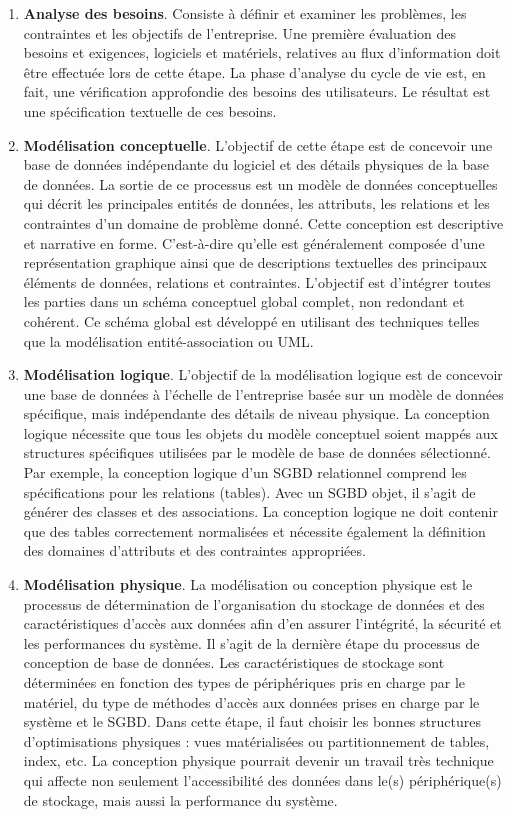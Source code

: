 \begin{enumerate}
 \item \textbf{Analyse des besoins}. Consiste à définir et examiner les problèmes, les contraintes et les objectifs de l'entreprise. Une première évaluation des besoins et exigences, logiciels et matériels, relatives au flux d'information doit être effectuée lors de cette étape. La phase d'analyse du cycle de vie est, en fait, une vérification approfondie des besoins des utilisateurs. Le résultat est une spécification textuelle de ces besoins.
 \item \textbf{Modélisation conceptuelle}. L'objectif de cette étape est de concevoir une base de données indépendante du logiciel et des détails physiques de la base de données. La sortie de ce processus est un modèle de données conceptuelles qui décrit les principales entités de données, les attributs, les relations et les contraintes d'un domaine de problème donné. Cette conception est descriptive et narrative en forme. C'est-à-dire qu'elle est généralement composée d'une représentation graphique ainsi que de descriptions textuelles des principaux éléments de données, relations et contraintes. L'objectif est d'intégrer toutes les parties dans un schéma conceptuel global complet, non redondant et cohérent. Ce schéma global est développé en utilisant des techniques telles que la modélisation entité-association ou \gls{UML}.
 \item \textbf{Modélisation logique}. L'objectif de la modélisation logique est de concevoir une base de données à l'échelle de l'entreprise basée sur un modèle de données spécifique, mais indépendante des détails de niveau physique. La conception logique nécessite que tous les objets du modèle conceptuel soient mappés aux structures spécifiques utilisées par le modèle de base de données sélectionné. Par exemple, la conception logique d'un SGBD relationnel comprend les spécifications pour les relations (tables). Avec un SGBD objet, il s’agit de générer des classes et des associations. La conception logique ne doit contenir que des tables correctement normalisées et nécessite également la définition des domaines d'attributs et des contraintes appropriées.
 \item \textbf{Modélisation physique}. La modélisation ou conception physique est le processus de détermination de l'organisation du stockage de données et des caractéristiques d'accès aux données afin d'en assurer l'intégrité, la sécurité et les performances du système. Il s'agit de la dernière étape du processus de conception de base de données. Les caractéristiques de stockage sont déterminées en fonction des types de périphériques pris en charge par le matériel, du type de méthodes d'accès aux données prises en charge par le système et le SGBD. Dans cette étape, il faut choisir les bonnes structures d'optimisations physiques : vues matérialisées ou partitionnement de tables, index, etc. La conception physique pourrait devenir un travail très technique qui affecte non seulement l'accessibilité des données dans le(s) périphérique(s) de stockage, mais aussi la performance du système.

\end{enumerate}
